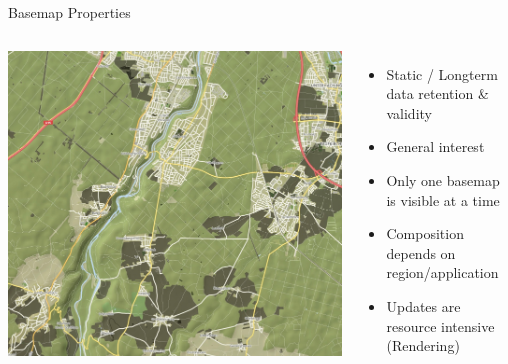 \documentclass{beamer}
\begin{document}
\begin{frame}{Basemap Properties}
 \begin{columns}
   \includegraphics[scale=0.15]{images/basemap_tile}
   \begin{itemize}
    \item Static / Longterm data retention & validity
    \item General interest
    \item Only one basemap is visible at a time
    \item Composition depends on region/application
    \item Updates are resource intensive (Rendering)
   \end{itemize}
 \end{columns}
\end{frame}
\end{document}
